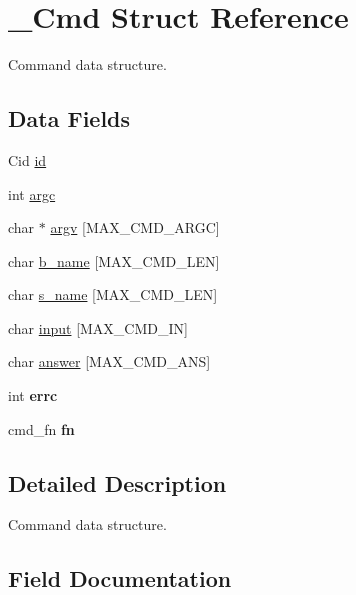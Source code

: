 \hypertarget{struct__Cmd}{}\section{\+\_\+\+Cmd Struct Reference}
\label{struct__Cmd}


Command data structure.  


\subsection*{Data Fields}
\begin{DoxyCompactItemize}
\item 
Cid \hyperlink{struct__Cmd_a106b2045967078710623e3a5f401dde2}{id}
\item 
int \hyperlink{struct__Cmd_af56ffa5c8c8f19251b15dc02a7eb352d}{argc}
\item 
char $\ast$ \hyperlink{struct__Cmd_aaaa6f539ab5219743163ecb74138fe7a}{argv} \mbox{[}M\+A\+X\+\_\+\+C\+M\+D\+\_\+\+A\+R\+GC\mbox{]}
\item 
char \hyperlink{struct__Cmd_adb97870a775bf9f9075d44420cb82439}{b\+\_\+name} \mbox{[}M\+A\+X\+\_\+\+C\+M\+D\+\_\+\+L\+EN\mbox{]}
\item 
char \hyperlink{struct__Cmd_ac7a8c09e258cb2b2f63d179943616d08}{s\+\_\+name} \mbox{[}M\+A\+X\+\_\+\+C\+M\+D\+\_\+\+L\+EN\mbox{]}
\item 
char \hyperlink{struct__Cmd_a3d023ded28ab2b9ec8daae3ebf1a3759}{input} \mbox{[}M\+A\+X\+\_\+\+C\+M\+D\+\_\+\+IN\mbox{]}
\item 
char \hyperlink{struct__Cmd_a143c62700ed611e1ff0d70611c76fa55}{answer} \mbox{[}M\+A\+X\+\_\+\+C\+M\+D\+\_\+\+A\+NS\mbox{]}
\item 
\mbox{\label{struct__Cmd_a4f3acf8cfdc67548121c1989765cbbcf}} 
int {\bfseries errc}
\item 
\mbox{\label{struct__Cmd_abfca5a0889206135702ed3e398079bad}} 
cmd\+\_\+fn {\bfseries fn}
\end{DoxyCompactItemize}


\subsection{Detailed Description}
Command data structure. 

\subsection{Field Documentation}
\mbox{\label{struct__Cmd_a143c62700ed611e1ff0d70611c76fa55}} 
